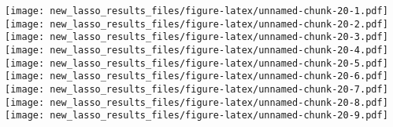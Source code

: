\documentclass[
]{article}
\newenvironment{Shaded}{\begin{snugshade}}{\end{snugshade}}
\newcommand{\CommentTok}[1]{\textcolor[rgb]{0.56,0.35,0.01}{\textit{#1}}}
\newcommand{\ControlFlowTok}[1]{\textcolor[rgb]{0.13,0.29,0.53}{\textbf{#1}}}
\newcommand{\DataTypeTok}[1]{\textcolor[rgb]{0.13,0.29,0.53}{#1}}
\newcommand{\DecValTok}[1]{\textcolor[rgb]{0.00,0.00,0.81}{#1}}
\newcommand{\FloatTok}[1]{\textcolor[rgb]{0.00,0.00,0.81}{#1}}
\newcommand{\KeywordTok}[1]{\textcolor[rgb]{0.13,0.29,0.53}{\textbf{#1}}}
\newcommand{\NormalTok}[1]{#1}
\newcommand{\OperatorTok}[1]{\textcolor[rgb]{0.81,0.36,0.00}{\textbf{#1}}}
\newcommand{\StringTok}[1]{\textcolor[rgb]{0.31,0.60,0.02}{#1}}
\begin{document}
\begin{Shaded}
\end{Shaded}

\texttt{[image: new\_lasso\_results\_files/figure-latex/unnamed-chunk-20-1.pdf]}
\texttt{[image: new\_lasso\_results\_files/figure-latex/unnamed-chunk-20-2.pdf]}
\texttt{[image: new\_lasso\_results\_files/figure-latex/unnamed-chunk-20-3.pdf]}
\texttt{[image: new\_lasso\_results\_files/figure-latex/unnamed-chunk-20-4.pdf]}
\texttt{[image: new\_lasso\_results\_files/figure-latex/unnamed-chunk-20-5.pdf]}
\texttt{[image: new\_lasso\_results\_files/figure-latex/unnamed-chunk-20-6.pdf]}
\texttt{[image: new\_lasso\_results\_files/figure-latex/unnamed-chunk-20-7.pdf]}
\texttt{[image: new\_lasso\_results\_files/figure-latex/unnamed-chunk-20-8.pdf]}
\texttt{[image: new\_lasso\_results\_files/figure-latex/unnamed-chunk-20-9.pdf]}
\end{document}
